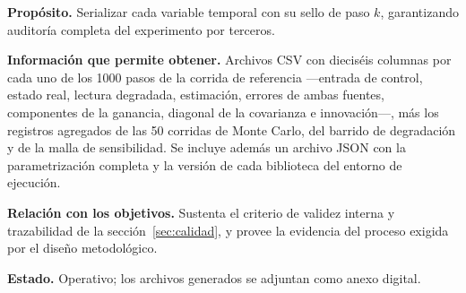 \textbf{Propósito.} Serializar cada variable temporal con su sello de paso $k$,
garantizando auditoría completa del experimento por terceros.

\textbf{Información que permite obtener.} Archivos CSV con dieciséis columnas
por cada uno de los \num{1000} pasos de la corrida de referencia —entrada de
control, estado real, lectura degradada, estimación, errores de ambas fuentes,
componentes de la ganancia, diagonal de la covarianza e innovación—, más los
registros agregados de las \num{50} corridas de Monte Carlo, del barrido de
degradación y de la malla de sensibilidad. Se incluye además un archivo JSON con
la parametrización completa y la versión de cada biblioteca del entorno de
ejecución.

\textbf{Relación con los objetivos.} Sustenta el criterio de validez interna y
trazabilidad de la sección~\ref{sec:calidad}, y provee la evidencia del proceso
exigida por el diseño metodológico.

\textbf{Estado.} Operativo; los archivos generados se adjuntan como anexo
digital.
